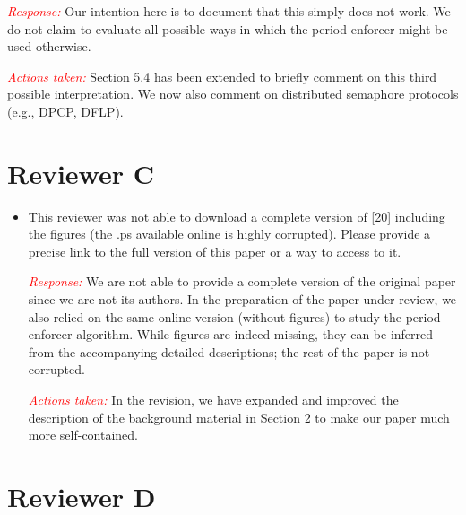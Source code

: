 \documentclass[12pt]{article}
\newenvironment{response}[0]{\textcolor{red}{\emph{Response: }}\color{blue}}{\medskip}
\newcommand{\action}[1]{\textcolor{red}{\emph{\it Actions taken: }}{\color{blue}#1}\medskip}
\begin{document}
\begin{itemize}
\begin{response}
Our intention here is to document that this simply does not work. We do not claim to evaluate all possible ways in which the period enforcer might be used otherwise.
	
\end{response}

\action{Section 5.4 has been extended to briefly comment on this third possible interpretation. We now also comment on distributed semaphore protocols (e.g., DPCP, DFLP).}

\end{itemize}


\section*{Reviewer C}

\begin{itemize}
	\item   
This reviewer was not able to download a complete version of [20] including
the figures (the .ps available online is highly corrupted). Please provide a
precise link to the full version of this paper or a way to access to it. 

\begin{response}We are not able to provide a complete version of the original paper since we are not its authors. In the preparation of the paper under review, we also relied on the same online version (without figures) to study the period enforcer algorithm. While figures are indeed missing, they can be inferred from the accompanying detailed  descriptions; the rest of the paper is not corrupted.
	
\end{response}


\action{In the revision, we have expanded and improved the description of the background material in Section 2 to make our paper much more self-contained.}


\end{itemize}


\section*{Reviewer D}
\end{document}
